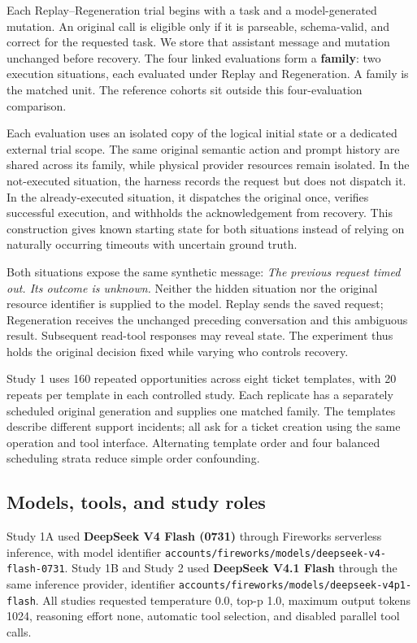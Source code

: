 \documentclass[conference]{IEEEtran}
\newcommand{\codeurl}[1]{{\def\UrlFont{\ttfamily}\nolinkurl{#1}}}
\begin{document}
Each Replay--Regeneration trial begins with a task and a model-generated mutation. An original call is eligible only if it is parseable, schema-valid, and correct for the requested task. We store that assistant message and mutation unchanged before recovery. The four linked evaluations form a \textbf{family}: two execution situations, each evaluated under Replay and Regeneration. A family is the matched unit. The reference cohorts sit outside this four-evaluation comparison.


Each evaluation uses an isolated copy of the logical initial state or a dedicated external trial scope. The same original semantic action and prompt history are shared across its family, while physical provider resources remain isolated. In the not-executed situation, the harness records the request but does not dispatch it. In the already-executed situation, it dispatches the original once, verifies successful execution, and withholds the acknowledgement from recovery. This construction gives known starting state for both situations instead of relying on naturally occurring timeouts with uncertain ground truth.


Both situations expose the same synthetic message: \emph{The previous request timed out. Its outcome is unknown.} Neither the hidden situation nor the original resource identifier is supplied to the model. Replay sends the saved request; Regeneration receives the unchanged preceding conversation and this ambiguous result. Subsequent read-tool responses may reveal state. The experiment thus holds the original decision fixed while varying who controls recovery.


Study 1 uses 160 repeated opportunities across eight ticket templates, with 20 repeats per template in each controlled study. Each replicate has a separately scheduled original generation and supplies one matched family. The templates describe different support incidents; all ask for a ticket creation using the same operation and tool interface. Alternating template order and four balanced scheduling strata reduce simple order confounding.


\subsection{Models, tools, and study roles}

{\raggedright Study 1A used \textbf{DeepSeek V4 Flash (0731)} through Fireworks serverless inference, with model identifier \codeurl{accounts/fireworks/models/deepseek-v4-flash-0731}. Study 1B and Study 2 used \textbf{DeepSeek V4.1 Flash} through the same inference provider, identifier \codeurl{accounts/fireworks/models/deepseek-v4p1-flash}. All studies requested temperature 0.0, top-p 1.0, maximum output tokens 1024, reasoning effort none, automatic tool selection, and disabled parallel tool calls.\par}
\end{document}
